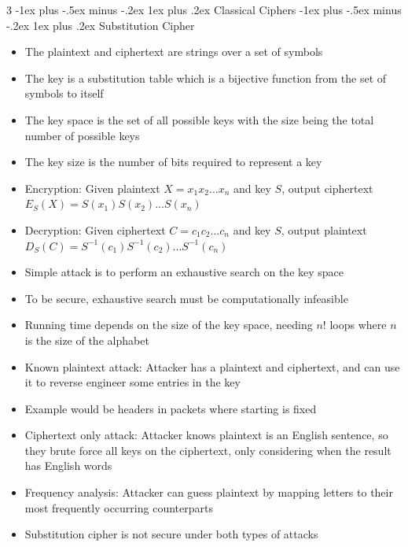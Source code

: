 \documentclass[10pt, landscape]{article}
\makeatletter
\renewcommand{\subsection}{\@startsection{subsection}{3}{0mm}%
                                {-1ex plus -.5ex minus -.2ex}%
                                {1ex plus .2ex}%
                                {\normalfont\small\bfseries}}%
\renewcommand{\subsubsection}{\@startsection{subsubsection}{4}{0mm}%
                                {-1ex plus -.5ex minus -.2ex}%
                                {1ex plus .2ex}%
                                {\normalfont\small\bfseries}}%
\makeatother
\begin{document}
\begin{multicols*}{3}
\subsection{Classical Ciphers}
\subsubsection{Substitution Cipher}
\begin{itemize}
    \item The plaintext and ciphertext are strings over a set of symbols
    \item The key is a substitution table which is a bijective function from the set of symbols to itself
    \item The key space is the set of all possible keys with the size being the total number of possible keys
    \item The key size is the number of bits required to represent a key
    \item Encryption: Given plaintext $X=x_1x_2...x_n$ and key $S$, output ciphertext $E_S(X)=S(x_1)S(x_2)...S(x_n)$
    \item Decryption: Given ciphertext $C=c_1c_2...c_n$ and key $S$, output plaintext $D_S(C)=S^{-1}(c_1)S^{-1}(c_2)...S^{-1}(c_n)$
    \item Simple attack is to perform an exhaustive search on the key space
    \item To be secure, exhaustive search must be computationally infeasible
    \item Running time depends on the size of the key space, needing $n!$ loops where $n$ is the size of the alphabet
    \item Known plaintext attack: Attacker has a plaintext and ciphertext, and can use it to reverse engineer some entries in the key
    \item Example would be headers in packets where starting is fixed
    \item Ciphertext only attack: Attacker knows plaintext is an English sentence, so they brute force all keys on the ciphertext, only considering when the result has English words
    \item Frequency analysis: Attacker can guess plaintext by mapping letters to their most frequently occurring counterparts
    \item Substitution cipher is not secure under both types of attacks
\end{itemize}


\end{multicols*}
\end{document}
